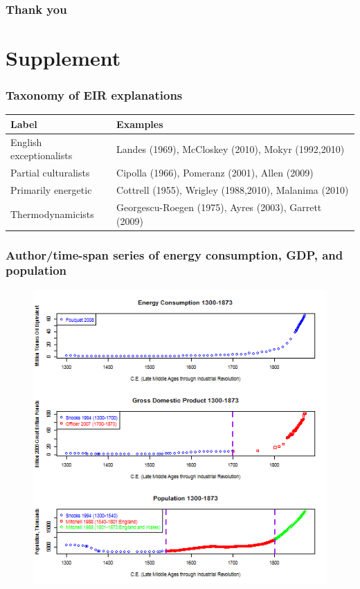 \documentclass[final]{beamer}
\begin{document}
\begin{frame}
\frametitle{Thank you}
\end{frame}

\section{Supplement}


\begin{frame}
\frametitle{Taxonomy of EIR explanations}
\footnotesize{
\begin{table}[p!]
\label{tbl:taxonomy}
\begin{tabular}{ll}
Label&Examples\\
\hline \hline
English exceptionalists&Landes (1969), McCloskey (2010), Mokyr (1992,2010)\\
Partial culturalists&Cipolla (1966), Pomeranz (2001), Allen (2009)\\
Primarily energetic&Cottrell (1955), Wrigley (1988,2010), Malanima (2010)\\
Thermodynamicists&Georgescu-Roegen (1975), Ayres (2003), Garrett (2009)\\
\end{tabular}
\end{table}
}
\end{frame}

\begin{frame}
\frametitle{Author/time-span series of energy consumption, GDP, and population}
\begin{figure}[p!]
\center
\label{fig:overall levels}
\includegraphics[height=0.8\textheight]{overallLevels}
\end{figure}
\end{frame}
\end{document}
